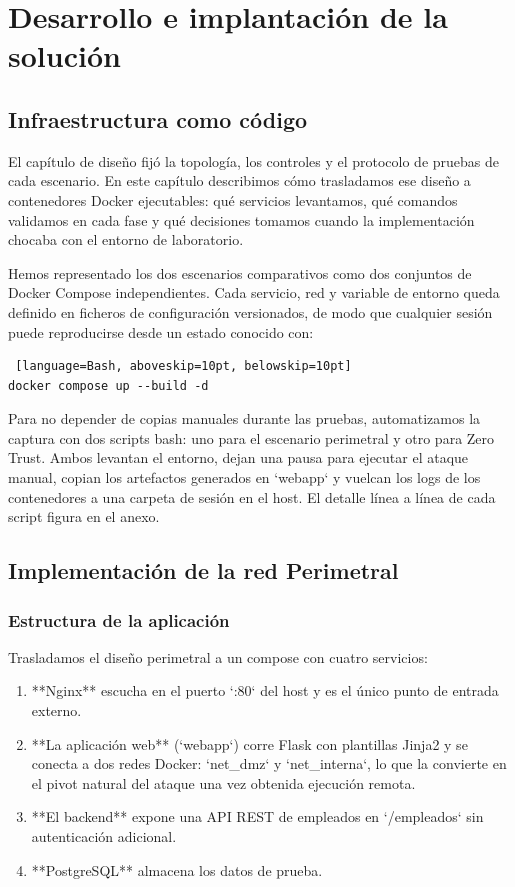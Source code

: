 \documentclass[11pt,spanish,listoffigures,listoftables]{tfgetsinf}
\begin{document}

\chapter{Desarrollo e implantación de la solución}
    
    \section{Infraestructura como código}
    El capítulo de diseño fijó la topología, los controles y el protocolo de pruebas de cada escenario. En este capítulo describimos cómo trasladamos ese diseño a contenedores Docker ejecutables: qué servicios levantamos, qué comandos validamos en cada fase y qué decisiones tomamos cuando la implementación chocaba con el entorno de laboratorio.
    
    Hemos representado los dos escenarios comparativos como dos conjuntos de Docker Compose independientes. Cada servicio, red y variable de entorno queda definido en ficheros de configuración versionados, de modo que cualquier sesión puede reproducirse desde un estado conocido con:
    
    \begin{lstlisting} [language=Bash, aboveskip=10pt, belowskip=10pt]
docker compose up --build -d
    \end{lstlisting}
    
    Para no depender de copias manuales durante las pruebas, automatizamos la captura con dos scripts bash: uno para el escenario perimetral y otro para Zero Trust. Ambos levantan el entorno, dejan una pausa para ejecutar el ataque manual, copian los artefactos generados en `webapp` y vuelcan los logs de los contenedores a una carpeta de sesión en el host. El detalle línea a línea de cada script figura en el anexo.
    
    \section{Implementación de la red Perimetral}
        \subsection{Estructura de la aplicación}
        Trasladamos el diseño perimetral a un compose con cuatro servicios:
        \begin{enumerate}
            \item **Nginx** escucha en el puerto `:80` del host y es el único punto de entrada externo.
            \item **La aplicación web** (`webapp`) corre Flask con plantillas Jinja2 y se conecta a dos redes Docker: `net\_dmz` y `net\_interna`, lo que la convierte en el pivot natural del ataque una vez obtenida ejecución remota.
            \item **El backend** expone una API REST de empleados en `/empleados` sin autenticación adicional.
            \item **PostgreSQL** almacena los datos de prueba.
        \end{enumerate}
        
\end{document}
